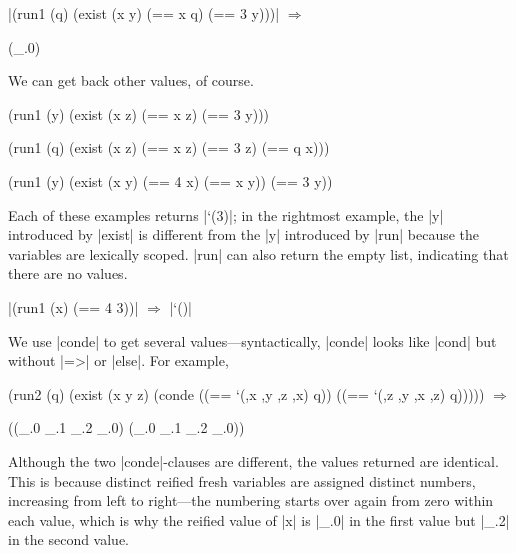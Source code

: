 \wspace

\noindent\scheme|(run1 (q) (exist (x y) (== x q) (== 3 y)))| $\Rightarrow$ \begin{schemeresponsebox}(_.0)\end{schemeresponsebox}

\wspace

We can get back other values, of course.

\wspace

\begin{schemebox}
(run1 (y)
  (exist (x z) 
    (== x z)
    (== 3 y)))
$\ $
\end{schemebox}
\begin{schemebox}
(run1 (q)
  (exist (x z)
    (== x z)
    (== 3 z)
    (== q x)))
\end{schemebox}
\begin{schemebox}
(run1 (y)
  (exist (x y)
    (== 4 x)
    (== x y))
  (== 3 y))
\end{schemebox}

\wspace

\noindent Each of these examples returns \scheme|`(3)|; in the rightmost example, the \scheme|y| introduced by \scheme|exist| is different from the \scheme|y| introduced by \scheme|run| because the variables are lexically scoped.  \scheme|run| can also return the empty list, indicating that there are no values.

\wspace

\noindent\scheme|(run1 (x) (== 4 3))| $\Rightarrow$ \schemeresult|`()|

\wspace

We use \scheme|conde| to get several values---syntactically,
\scheme|conde| looks like \scheme|cond| but without \scheme|=>|
or \scheme|else|.  For example,

\schemedisplayspace
\begin{schemedisplay}
(run2 (q)
  (exist (x y z)
    (conde
      ((== `(,x ,y ,z ,x) q))
      ((== `(,z ,y ,x ,z) q))))) $\Rightarrow$ 
\end{schemedisplay}
\nspace
\begin{schemeresponse}
((_.0 _.1 _.2 _.0) (_.0 _.1 _.2 _.0))
\end{schemeresponse}

\noindent Although the two \scheme|conde|-clauses are different, the
values returned are identical.  This is because distinct reified fresh
variables are assigned distinct numbers, increasing from left to
right---the numbering starts over again from zero within each value,
which is why the reified value of \scheme|x|
is \schemeresult|_.0| in the first
value but \schemeresult|_.2| in the
second value.

